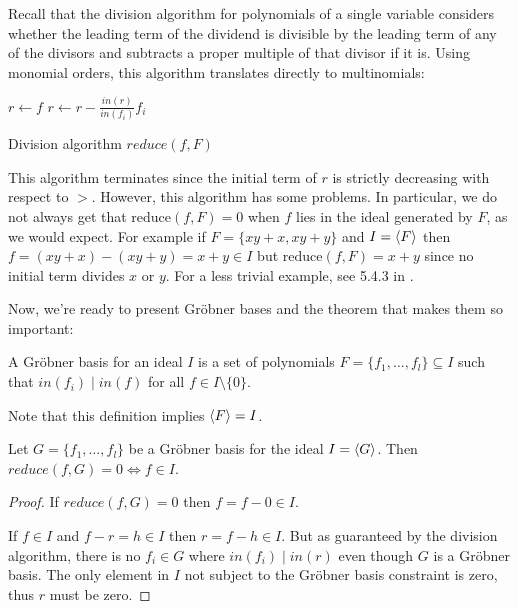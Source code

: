 \documentclass{article}
\theoremstyle{changedot}
\theoremstyle{changedotbreak}
\theoremstyle{nonumberplain}
\newtheorem{proof}{Proof}
\DeclarePairedDelimiter{\tuple}{\langle}{\rangle}
\begin{document}
Recall that the division algorithm for polynomials of a single variable considers whether the leading term of the dividend is divisible by the leading term of any of the divisors and subtracts a proper multiple of that divisor if it is. Using monomial orders, this algorithm translates directly to multinomials:

\begin{algorithm}[H]
\DontPrintSemicolon

  $r \leftarrow f$\;
    {
        $r \leftarrow r - \frac{in(r)}{in(f_{i})} f_{i}$
    }

    \caption{Division algorithm $reduce(f, F)$}
    \label{alg:div}
\end{algorithm}

This algorithm terminates since the initial term of $r$ is strictly decreasing with respect to $>$. However, this algorithm has some problems. In particular, we do not always get that $\text{reduce}(f, F) = 0$ when $f$ lies in the ideal generated by $F$, as we would expect. For example if $F = \{xy+x, xy+y\}$ and $I = \tuple{F}$ then $f = (xy+x) - (xy+y) = x+y \in I$ but $\text{reduce}(f, F) = x+y$ since no initial term divides $x$ or $y$. For a less trivial example, see 5.4.3 in \cite{NL}.

Now, we're ready to present Gröbner bases and the theorem that makes them so important:

\begin{definition}
  A Gröbner basis for an ideal $I$ is a set of polynomials $F = \{f_{1}, \dots, f_{l}\} \subseteq I$ such that $in(f_{i}) \mid in(f)$ for all $f \in I\setminus \{0\}$.
\end{definition}
Note that this definition implies $\tuple F = I$.

\begin{theorem}
  Let $G = \{f_{1}, \dots, f_{l}\}$ be a Gröbner basis for the ideal $I = \tuple{G}$. Then $reduce(f, G) = 0 \Longleftrightarrow f \in I$.
\end{theorem}
\begin{proof}
  If $reduce(f, G) = 0$ then $f = f - 0 \in I$.

  If $f \in I$ and $f - r = h \in I$ then $r = f - h \in I$. But as guaranteed by the division algorithm, there is no $f_{i} \in G$ where $in(f_{i}) \mid in(r)$ even though $G$ is a Gröbner basis. The only element in $I$ not subject to the Gröbner basis constraint is zero, thus $r$ must be zero.
\end{proof}
\end{document}
